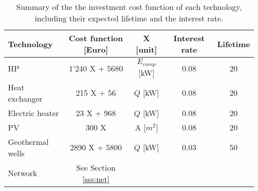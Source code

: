 \begin{table}[htp]
	\centering
	\caption{Summary of the the investment cost function of each technology, including their expected lifetime and the interest rate.}
	\label{tab:ic}
	\begin{tabular}{lcccc} \toprule
		\textbf{Technology} & Cost function [Euro] & X  [unit]       & Interest rate & Lifetime \\ \midrule
		HP                  & 1'240 X + 5680       & $E_{comp}$ [kW] & 0.08                              & 20                           \\
		Heat exchanger      & 215 X + 56          & $Q$ [kW]        & 0.08                              & 20                           \\
	 	Electric heater		& 23 X + 968		  &	$Q$ [kW] 		 & 0.08								& 20						   \\
		PV                  & 300 X                & A [$m^{2}$]     & 0.08                              & 20                           \\
		Geothermal wells    & 2890 X + 5800        & $Q$ [kW]        & 0.03                              & 50                  			 \\
		Network				& See Section \ref{sss:net}		&		 &									 &					    \\ \bottomrule     
	\end{tabular}
\end{table}